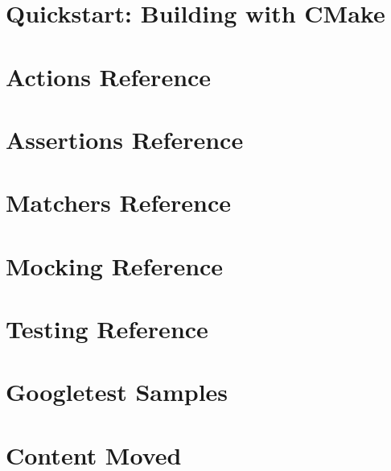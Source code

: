 \let\mypdfximage\pdfximage\def\pdfximage{\immediate\mypdfximage}\documentclass[twoside]{book}
\newcommand{\+}{\discretionary{\mbox{\scriptsize$\hookleftarrow$}}{}{}}
\begin{document}
\chapter{Quickstart\+: Building with C\+Make}
\label{md_build_googletest-src_docs_quickstart-cmake}

\chapter{Actions Reference}
\label{md_build_googletest-src_docs_reference_actions}

\chapter{Assertions Reference}
\label{md_build_googletest-src_docs_reference_assertions}

\chapter{Matchers Reference}
\label{md_build_googletest-src_docs_reference_matchers}

\chapter{Mocking Reference}
\label{md_build_googletest-src_docs_reference_mocking}

\chapter{Testing Reference}
\label{md_build_googletest-src_docs_reference_testing}

\chapter{Googletest Samples}
\label{md_build_googletest-src_docs_samples}

\chapter{Content Moved}
\label{md_build_googletest-src_googlemock_docs_README}

\end{document}
